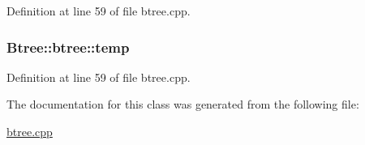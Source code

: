 Definition at line 59 of file btree.\-cpp.

\hypertarget{class_btree_1_1btree_aebd6a5907225b0090560122592b2f3a9}{
\subsubsection[{temp}]{ Btree\-::btree\-::temp}}\label{class_btree_1_1btree_aebd6a5907225b0090560122592b2f3a9}


Definition at line 59 of file btree.\-cpp.



The documentation for this class was generated from the following file\-:\begin{DoxyCompactItemize}
\item 
\hyperlink{btree_8cpp}{btree.\-cpp}\end{DoxyCompactItemize}
